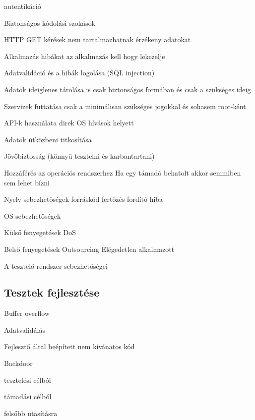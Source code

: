 \documentclass[a4paper,14pt, twocolumn]{extarticle}
\begin{document}
\begin{compactitem}
{\begin{compactitem}
					\item autentikáció
				\end{compactitem}
			}
			\item Biztonságos kódolási szokások
			{
				\begin{compactitem}
					\item HTTP GET kérések nem tartalmazhatnak érzékeny adatokat 
					\item Alkalmazás hibákat az alkalmazás kell hogy lekezelje 
					\item Adatvalidáció és a hibák logolása (SQL injection) 
					\item Adatok ideiglenes tárolása is csak biztonságos formában és csak a szükséges ideig 
					\item Szervizek futtatása csak a minimálisan szükséges jogokkal és sohasem root-ként 
					\item API-k használata direk OS hívások helyett 
					\item Adatok útközbeni titkosítása 
					\item Jövőbiztosság (könnyű tesztelni és karbantartani) 
				\end{compactitem}
			}
			\item Hozzáférés az operációs rendszerhez
				\subitem Ha egy támadó behatolt akkor semmiben sem lehet bízni 
			\item Nyelv sebezhetőségek
				\subitem forráskód fertőzés
				\subitem fordító hiba
			\item OS sebezhetőségek 
			\item Külső fenyegetések
				\subitem DoS
			\item Belső fenyegetések
				\subitem Outsourcing 
				\subitem Elégedetlen alkalmazott 
			\item A tesztelő rendszer sebezhetőségei
		\end{compactitem}
		\subsection{Tesztek fejlesztése}
			\begin{compactitem}
				\item Buffer overflow 
				\item Adatvalidálás 
				\item Fejlesztő által beépített nem kívánatos kód 
				\item Backdoor 
				\begin{compactitem}
					\item tesztelési célból
					\item támadási célból
					\item felsőbb utasításra
				\end{compactitem}
			\end{compactitem}
		
\end{document}
